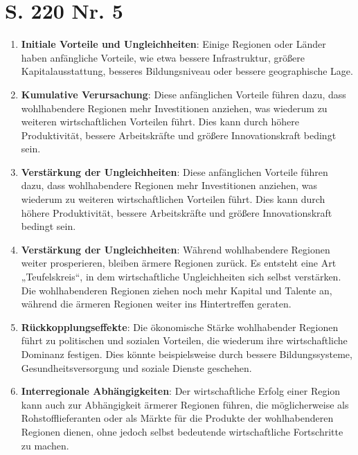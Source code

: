 \documentclass[12pt,a4paper]{report}
\begin{document}
	\section{S. 220 Nr. 5}
	\begin{enumerate}
		\item \textbf{Initiale Vorteile und Ungleichheiten}: Einige Regionen oder Länder haben anfängliche Vorteile, wie etwa bessere Infrastruktur, größere Kapitalausstattung, besseres Bildungsniveau oder bessere geographische Lage.
		\item \textbf{Kumulative Verursachung}: Diese anfänglichen Vorteile führen dazu, dass wohlhabendere Regionen mehr Investitionen anziehen, was wiederum zu weiteren wirtschaftlichen Vorteilen führt. Dies kann durch höhere Produktivität, bessere Arbeitskräfte und größere Innovationskraft bedingt sein.
		\item \textbf{Verstärkung der Ungleichheiten}: Diese anfänglichen Vorteile führen dazu, dass wohlhabendere Regionen mehr Investitionen anziehen, was wiederum zu weiteren wirtschaftlichen Vorteilen führt. Dies kann durch höhere Produktivität, bessere Arbeitskräfte und größere Innovationskraft bedingt sein.
		\item \textbf{Verstärkung der Ungleichheiten}: Während wohlhabendere Regionen weiter prosperieren, bleiben ärmere Regionen zurück. Es entsteht eine Art „Teufelskreis“, in dem wirtschaftliche Ungleichheiten sich selbst verstärken. Die wohlhabenderen Regionen ziehen noch mehr Kapital und Talente an, während die ärmeren Regionen weiter ins Hintertreffen geraten.
		\item \textbf{Rückkopplungseffekte}: Die ökonomische Stärke wohlhabender Regionen führt zu politischen und sozialen Vorteilen, die wiederum ihre wirtschaftliche Dominanz festigen. Dies könnte beispielsweise durch bessere Bildungssysteme, Gesundheitsversorgung und soziale Dienste geschehen.
		\item \textbf{Interregionale Abhängigkeiten}: Der wirtschaftliche Erfolg einer Region kann auch zur Abhängigkeit ärmerer Regionen führen, die möglicherweise als Rohstofflieferanten oder als Märkte für die Produkte der wohlhabenderen Regionen dienen, ohne jedoch selbst bedeutende wirtschaftliche Fortschritte zu machen.
	\end{enumerate}
	
\end{document}
